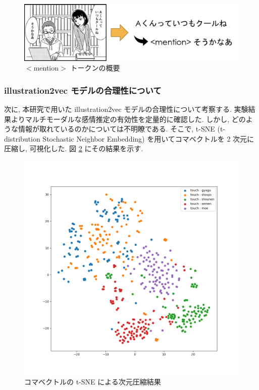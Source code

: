 \begin{figure}[!h]
  \vspace{20mm}
  \centering
  \includegraphics[width=1.0\hsize]{doc/figures/mention.png}
  \caption{$<$mention$>$ トークンの概要}
  \label{fig:mention}
\end{figure}

\newpage
\changeindent{0cm}
\subsubsection{illustration2vec モデルの合理性について}
\changeindent{2cm}

次に, 本研究で用いた illustration2vec モデルの合理性について考察する. 実験結果よりマルチモーダルな感情推定の有効性を定量的に確認した. しかし, どのような情報が取れているのかについては不明瞭である. そこで, t-SNE (t-distribution Stochastic Neighbor Embedding) \cite{vanDerMaaten2008} を用いてコマベクトルを 2 次元に圧縮し, 可視化した. 図 \ref{fig:koma_tsne} にその結果を示す.

\begin{figure}[!h]
  \vspace{5mm}
  \centering
  \includegraphics[width=0.9\hsize]{doc/figures/koma_tsne.png}
  \caption{コマベクトルの t-SNE による次元圧縮結果}
  \label{fig:koma_tsne}
\end{figure}

